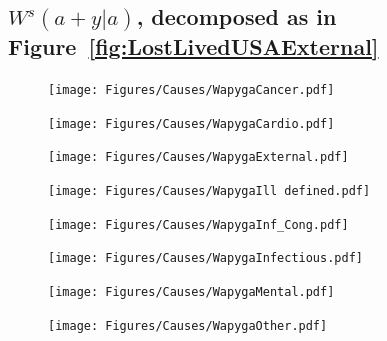 \documentclass{article}
\begin{document}
\begin{appendices}
\subsection{$W^s(a+y|a)$, decomposed as in
Figure~\ref{fig:LostLivedUSAExternal}}
\begin{figure}
\centering
\texttt{[image: Figures/Causes/WapygaCancer.pdf]}
\end{figure}
\begin{figure}
\centering
\texttt{[image: Figures/Causes/WapygaCardio.pdf]}
\end{figure}
\begin{figure}
\centering
\texttt{[image: Figures/Causes/WapygaExternal.pdf]}
\end{figure}
\begin{figure}
\centering
\texttt{[image: Figures/Causes/WapygaIll defined.pdf]}
\end{figure}
\begin{figure}
\centering
\texttt{[image: Figures/Causes/WapygaInf\_Cong.pdf]}
\end{figure}
\begin{figure}
\centering
\texttt{[image: Figures/Causes/WapygaInfectious.pdf]}
\end{figure}
\begin{figure}
\centering
\texttt{[image: Figures/Causes/WapygaMental.pdf]}
\end{figure}
\begin{figure}
\centering
\texttt{[image: Figures/Causes/WapygaOther.pdf]}
\end{figure}

\end{appendices}
\end{document}
